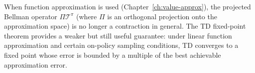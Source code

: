 When function approximation is used (Chapter~\ref{ch:value-approx}), the
projected Bellman operator $\Pi \mathcal{T}^\pi$ (where $\Pi$ is an
orthogonal projection onto the approximation space) is no longer a
contraction in general.  The TD fixed-point theorem provides a weaker but
still useful guarantee: under linear function approximation and certain
on-policy sampling conditions, TD converges to a fixed point whose error
is bounded by a multiple of the best achievable approximation error.

